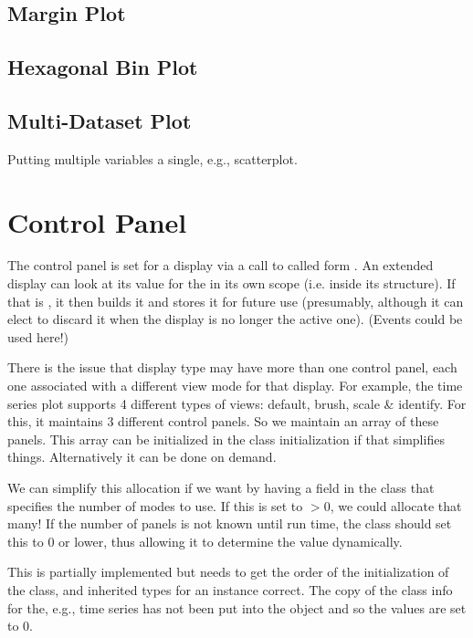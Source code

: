 \documentclass{article}
\begin{document}
\subsection{Margin Plot}

\subsection{Hexagonal Bin Plot}

\subsection{Multi-Dataset Plot}
Putting multiple variables  a single, e.g., scatterplot.


\section{Control Panel}

The control panel is set for a display via a call to
 called form .  An
extended display can look at its value for the  in
its own scope (i.e. inside its  structure).
If that is \Cnull, it then builds it and stores it for future use
(presumably, although it can elect to discard it when the display is
no longer the active one). (Events could be used here!)

There is the issue that display type may have more than one control
panel, each one associated with a different view mode for that
display.  For example, the time series plot supports 4 different types
of views: default, brush, scale \& identify.  For this, it maintains 3
different control panels.  So we maintain an array of these panels.
This array can be initialized in the class initialization if that
simplifies things. Alternatively it can be done on demand.

We can simplify this allocation if we want by having a field in the
class that specifies the number of modes to use.  If this is set to $>
0$, we could allocate that many!  If the number of panels is not known
until run time, the class should set this to 0 or lower, thus allowing
it to determine the value dynamically. 

 This is partially implemented but needs to get the order of the
initialization of the class, and inherited types for an instance
correct. The copy of the class info for the, e.g., time series has not
been put into the object and so the values are set to $0$.
\end{document}
